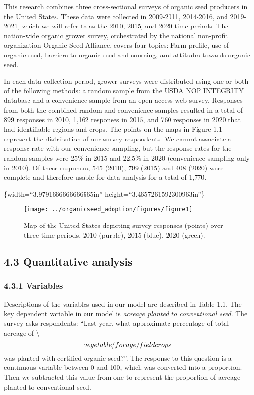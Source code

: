 \documentclass[twoside,12pt,final]{ucthesis-CA2012}
\begin{document}
\begin{ucmainmatter}
This research combines three cross-sectional surveys of organic seed
producers in the United States. These data were collected in 2009-2011,
2014-2016, and 2019-2021, which we will refer to as the 2010, 2015, and
2020 time periods. The nation-wide organic grower survey, orchestrated
by the national non-profit organization Organic Seed Alliance, covers
four topics: Farm profile, use of organic seed, barriers to organic seed
and sourcing, and attitudes towards organic seed.

In each data collection period, grower surveys were distributed using
one or both of the following methods: a random sample from the USDA NOP
INTEGRITY database and a convenience sample from an open-access web
survey. Responses from both the combined random and convenience samples
resulted in a total of 899 responses in 2010, 1,162 responses in 2015,
and 760 responses in 2020 that had identifiable regions and crops. The
points on the maps in Figure 1.1 represent the distribution of our
survey respondents. We cannot associate a response rate with our
convenience sampling, but the response rates for the random samples were
25\% in 2015 and 22.5\% in 2020 (convenience sampling only in 2010). Of
these responses, 545 (2010), 799 (2015) and 408 (2020) were complete and
therefore usable for data analysis for a total of 1,770.

\{width=``3.9791666666666665in''
height=``3.4657261592300963in''\}
\begin{figure}

{\centering \texttt{[image: ../organicseed\_adoption/figures/figure1]} 

}

\caption{Map of the United States depicting survey responses (points) over three time periods, 2010 (purple), 2015 (blue), 2020 (green).}\label{fig:unnamed-chunk-8}
\end{figure}
\hypertarget{quantitative-analysis}{%
\subsection{4.3 Quantitative analysis}\label{quantitative-analysis}}

\hypertarget{variables}{%
\subsubsection{4.3.1 Variables}\label{variables}}

Descriptions of the variables used in our model are described in Table
1.1. The key dependent variable in our model is \emph{acreage planted to
conventional seed}. The survey asks respondents: ``Last year, what
approximate percentage of total acreage of \textbackslash{}\[vegetable/forage/field
crops\\\] was planted with certified organic seed?''. The response to
this question is a continuous variable between 0 and 100, which was
converted into a proportion. Then we subtracted this value from one to
represent the proportion of acreage planted to conventional seed.


\end{ucmainmatter}
\end{document}
